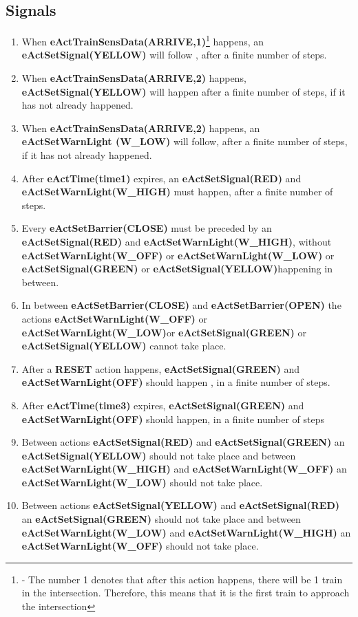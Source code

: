 \documentclass[10pt,a4paper]{article}
\begin{document}
\subsection{Signals}
\begin{enumerate}[resume]
\item When \textbf{eActTrainSensData(ARRIVE,1)}\footnote{ - The number 1 denotes that after this action happens, there will be 1 train in the intersection. Therefore, this means that it is the first train to approach the intersection} happens, an \textbf{eActSetSignal(YELLOW)} will follow , after a finite number of steps.
\item When \textbf{eActTrainSensData(ARRIVE,2)} happens, \textbf{eActSetSignal(YELLOW)} will happen after a finite number of steps, if it has not already happened.
\item When \textbf{eActTrainSensData(ARRIVE,2)} happens, an \textbf{eActSetWarnLight (W\_LOW)} will follow, after a finite number of steps, if it has not already happened.
\item After \textbf{eActTime(time1)} expires, an \textbf{eActSetSignal(RED)} and \textbf{eActSetWarnLight(W\_HIGH)} must happen, after a finite number of steps.
\item  Every \textbf{eActSetBarrier(CLOSE)} must be preceded by an \textbf{eActSetSignal(RED)} and \textbf{eActSetWarnLight(W\_HIGH)}, without \textbf{eActSetWarnLight(W\_OFF)} or \textbf{eActSetWarnLight(W\_LOW)} or \textbf{eActSetSignal(GREEN)} or \textbf{eActSetSignal(YELLOW)}happening in between.
\item In between \textbf{eActSetBarrier(CLOSE)} and \textbf{eActSetBarrier(OPEN)} the actions \textbf{eActSetWarnLight(W\_OFF)} or \textbf{eActSetWarnLight(W\_LOW)}or \textbf{eActSetSignal(GREEN)} or \textbf{eActSetSignal(YELLOW)} cannot take place.
\item After a \textbf{RESET} action happens, \textbf{eActSetSignal(GREEN)} and \textbf{eActSetWarnLight(OFF)} should happen  , in a finite number of steps.
\item After \textbf{eActTime(time3)} expires, \textbf{eActSetSignal(GREEN)} and \textbf{eActSetWarnLight(OFF)} should happen, in a finite number of steps
\item Between actions \textbf{eActSetSignal(RED)} and \textbf{eActSetSignal(GREEN)} an \textbf{eActSetSignal(YELLOW)} should not take place and between \textbf{eActSetWarnLight(W\_HIGH)} and \textbf{eActSetWarnLight(W\_OFF)} an \textbf{eActSetWarnLight(W\_LOW)} should not take place.
\item Between actions \textbf{eActSetSignal(YELLOW)} and \textbf{eActSetSignal(RED)} an \textbf{eActSetSignal(GREEN)} should not take place and between \textbf{eActSetWarnLight(W\_LOW)} and \textbf{eActSetWarnLight(W\_HIGH)} an \textbf{eActSetWarnLight(W\_OFF)} should not take place.
\end{enumerate}
\end{document}
